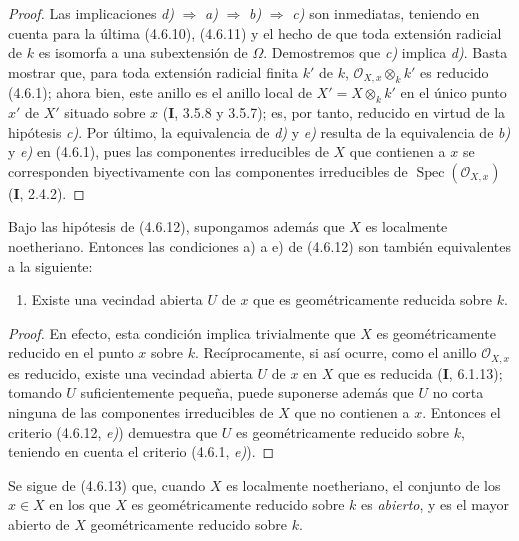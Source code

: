 \begin{proof}
Las implicaciones \emph{d)} $\Rightarrow$ \emph{a)} $\Rightarrow$ \emph{b)} $\Rightarrow$ \emph{c)} son
inmediatas, teniendo en cuenta para la última (4.6.10), (4.6.11) y el hecho de
que toda extensión radicial de $k$ es isomorfa a una subextensión de
$\Omega$. Demostremos que \emph{c)} implica \emph{d)}. Basta mostrar que, para toda
extensión radicial finita $k'$ de $k$, $\mathcal O_{X,x}\otimes_k k'$ es
reducido (4.6.1); ahora bien, este anillo es el anillo local de
$X'=X\otimes_k k'$ en el único punto $x'$ de $X'$ situado sobre $x$
(\textbf I, 3.5.8 y 3.5.7); es, por tanto, reducido en virtud de la hipótesis \emph{c)}. Por
último, la equivalencia de \emph{d)} y \emph{e)} resulta de la equivalencia de \emph{b)} y \emph{e)} en
(4.6.1), pues las componentes irreducibles de $X$ que contienen a $x$ se
corresponden biyectivamente con las componentes irreducibles de
$\operatorname{Spec}(\mathcal O_{X,x})$ (\textbf I, 2.4.2).
\end{proof}

\begin{corollary}[4.6.13]
\label{IV.2.4.6.13-fr}
Bajo las hipótesis de \textup{(4.6.12)}, supongamos además que $X$ es localmente
noetheriano. Entonces las condiciones a) a e) de \textup{(4.6.12)} son también
equivalentes a la siguiente:
\begin{enumerate}
\item[\textup{f)}] Existe una vecindad abierta $U$ de $x$ que es geométricamente
reducida sobre $k$.
\end{enumerate}
\end{corollary}

\begin{proof}
En efecto, esta condición implica trivialmente que $X$ es geométricamente
reducido en el punto $x$ sobre $k$. Recíprocamente, si así ocurre, como el
anillo $\mathcal O_{X,x}$ es reducido, existe una vecindad abierta $U$ de $x$
en $X$ que es reducida (\textbf I, 6.1.13); tomando $U$ suficientemente pequeña,
puede suponerse además que $U$ no corta ninguna de las componentes
irreducibles de $X$ que no contienen a $x$. Entonces el criterio (4.6.12, \emph{e)})
demuestra que $U$ es geométricamente reducido sobre $k$, teniendo en cuenta
el criterio (4.6.1, \emph{e)}).
\end{proof}

Se sigue de (4.6.13) que, cuando $X$ es localmente noetheriano, el conjunto de
los $x\in X$ en los que $X$ es geométricamente reducido sobre $k$ es
\emph{abierto}, y es el mayor abierto de $X$ geométricamente reducido sobre
$k$.

